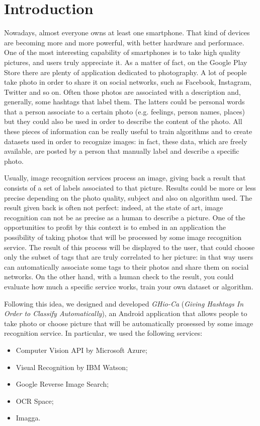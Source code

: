 \section{Introduction}

Nowadays, almost everyone owns at least one smartphone. That kind of devices are becoming more and more powerful, with better hardware and performace. One of the most interesting capability of smartphones is to take high quality pictures, and users truly appreciate it. As a matter of fact, on the Google Play Store there are plenty of application dedicated to photography.
A lot of people take photo in order to share it on social networks, such as Facebook, Instagram, Twitter and so on. Often those photos are associated with a description and, generally, some hashtags that label them. The latters could be personal words that a person associate to a certain photo (e.g. feelings, person names, places) but they could also be used in order to describe the content of the photo.
All these pieces of information can be really useful to train algorithms and to create datasets used in order to recognize images: in fact, these data, which are freely available, are posted by a person that manually label and describe a specific photo.

Usually, image recognition services process an image, giving back a result that consists of a set of labels associated to that picture. Results could be more or less precise depending on the photo quality, subject and also on algorithm used. The result given back is often not perfect: indeed, at the state of art, image recognition can not be as precise as a human to describe a picture.
One of the opportunities to profit by this context is to embed in an application the possibility of taking photos that will be processed by some image recognition service. The result of this process will be displayed to the user, that could choose only the subset of tags that are truly correlated to her picture: in that way users can automatically associate some tags to their photos and share them on
social networks. On the other hand, with a human check to the result, you could evaluate how much a specific service works, train your own dataset or algorithm. 

Following this idea, we designed and developed \textit{GHio-Ca} (\textit{Giving Hashtags In Order to Classify Automatically}), an Android application that allows people to take photo or choose picture that will be automatically prosessed by some image recognition service. In particular, we used the following services:
\begin{itemize}
	\item Computer Vision API by Microsoft Azure\cite{Microsoft};
	\item Visual Recognition by IBM Watson\cite{IBM};
	\item Google Reverse Image Search\cite{Google};
	\item OCR Space\cite{OCR};
	\item Imagga\cite{Imagga}.
\end{itemize}


